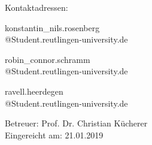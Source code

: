 \begin{titlepage}
\begin{center}
\vspace*{0.6cm}

Kontaktadressen:\\

\vspace*{0.3cm}
\begin{minipage}[H]{4cm}
\centering
{\normalsize konstantin\_nils.rosenberg\\@Student.reutlingen-university.de}
\\
\end{minipage}
\hfill
\begin{minipage}[H]{4cm}
\centering
{\normalsize robin\_connor.schramm\\@Student.reutlingen-university.de}\\
\end{minipage}
\hfill
\begin{minipage}[H]{4cm}
\centering
{\normalsize ravell.heerdegen\\@Student.reutlingen-university.de}
\\
\end{minipage}

\vspace*{0.8cm}
Betreuer: Prof. Dr. Christian Kücherer\\
\vspace*{0.4cm}
Eingereicht am:	21.01.2019



\end{center}

\end{titlepage}